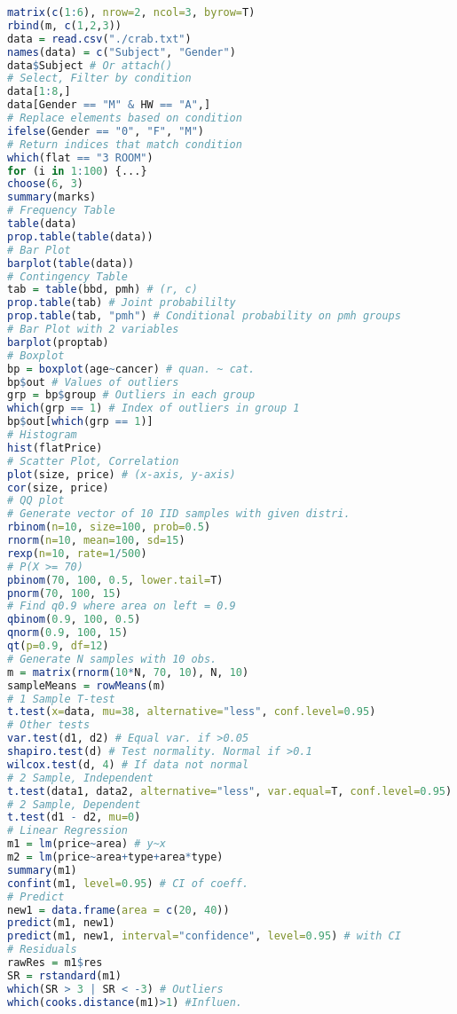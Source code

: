 \documentclass{article}
\begin{document}
\begin{multicols*}{4}
\begin{lstlisting}[language=R, breaklines=true]
matrix(c(1:6), nrow=2, ncol=3, byrow=T)
rbind(m, c(1,2,3))
data = read.csv("./crab.txt")
names(data) = c("Subject", "Gender")
data$Subject # Or attach()
# Select, Filter by condition
data[1:8,]
data[Gender == "M" & HW == "A",]
# Replace elements based on condition
ifelse(Gender == "0", "F", "M")
# Return indices that match condition
which(flat == "3 ROOM")
for (i in 1:100) {...}
choose(6, 3)
summary(marks)
# Frequency Table
table(data)
prop.table(table(data))
# Bar Plot
barplot(table(data))
# Contingency Table 
tab = table(bbd, pmh) # (r, c)
prop.table(tab) # Joint probabililty
prop.table(tab, "pmh") # Conditional probability on pmh groups
# Bar Plot with 2 variables
barplot(proptab)
# Boxplot
bp = boxplot(age~cancer) # quan. ~ cat.
bp$out # Values of outliers
grp = bp$group # Outliers in each group
which(grp == 1) # Index of outliers in group 1
bp$out[which(grp == 1)] 
# Histogram
hist(flatPrice)
# Scatter Plot, Correlation
plot(size, price) # (x-axis, y-axis)
cor(size, price)
# QQ plot
# Generate vector of 10 IID samples with given distri.
rbinom(n=10, size=100, prob=0.5)
rnorm(n=10, mean=100, sd=15)
rexp(n=10, rate=1/500)
# P(X >= 70)
pbinom(70, 100, 0.5, lower.tail=T)
pnorm(70, 100, 15)
# Find q0.9 where area on left = 0.9
qbinom(0.9, 100, 0.5)
qnorm(0.9, 100, 15)
qt(p=0.9, df=12)
# Generate N samples with 10 obs.
m = matrix(rnorm(10*N, 70, 10), N, 10)
sampleMeans = rowMeans(m)
# 1 Sample T-test
t.test(x=data, mu=38, alternative="less", conf.level=0.95)
# Other tests
var.test(d1, d2) # Equal var. if >0.05
shapiro.test(d) # Test normality. Normal if >0.1
wilcox.test(d, 4) # If data not normal
# 2 Sample, Independent
t.test(data1, data2, alternative="less", var.equal=T, conf.level=0.95)
# 2 Sample, Dependent
t.test(d1 - d2, mu=0)
# Linear Regression
m1 = lm(price~area) # y~x
m2 = lm(price~area+type+area*type) 
summary(m1)
confint(m1, level=0.95) # CI of coeff.
# Predict
new1 = data.frame(area = c(20, 40))
predict(m1, new1)
predict(m1, new1, interval="confidence", level=0.95) # with CI
# Residuals
rawRes = m1$res
SR = rstandard(m1)
which(SR > 3 | SR < -3) # Outliers
which(cooks.distance(m1)>1) #Influen.

\end{lstlisting}

\end{multicols*}
\end{document}
